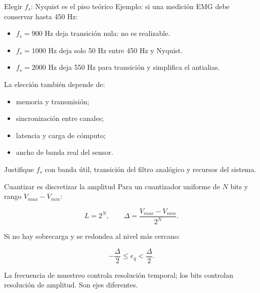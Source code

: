 \documentclass[
  ignorenonframetext,
  aspectratio=169,
  spanish,
  professionalfonts]{beamer}
\providecommand{\tightlist}{%
  \setlength{\itemsep}{0pt}\setlength{\parskip}{0pt}}
\begin{document}
\begin{frame}{Elegir \(f_s\): Nyquist es el piso teórico}
\protect{}\label{elegir-f_s-nyquist-es-el-piso-teuxf3rico}
Ejemplo: si una medición EMG debe conservar hasta 450 Hz:

\begin{itemize}
\tightlist
\item
  \(f_s=900\) Hz deja transición nula: no es realizable.
\item
  \(f_s=1000\) Hz deja solo 50 Hz entre 450 Hz y Nyquist.
\item
  \(f_s=2000\) Hz deja 550 Hz para transición y simplifica el antialias.
\end{itemize}

La elección también depende de:

\begin{itemize}
\tightlist
\item
  memoria y transmisión;
\item
  sincronización entre canales;
\item
  latencia y carga de cómputo;
\item
  ancho de banda real del sensor.
\end{itemize}

\begin{tcolorbox}[enhanced jigsaw, arc=.35mm, bottomrule=.15mm, bottomtitle=1mm, breakable, colback=white, colbacktitle=quarto-callout-note-color!10!white, colframe=quarto-callout-note-color-frame, coltitle=black, left=2mm, leftrule=.75mm, opacityback=0, opacitybacktitle=0.6, rightrule=.15mm, title={Criterio}, titlerule=0mm, toprule=.15mm, toptitle=1mm]

Justifique \(f_s\) con banda útil, transición del filtro analógico y
recursos del sistema.

\end{tcolorbox}
\end{frame}

\begin{frame}{Cuantizar es discretizar la amplitud}
\protect{}\label{cuantizar-es-discretizar-la-amplitud}
Para un cuantizador uniforme de \(N\) bits y rango \(V_{max}-V_{min}\):

\[
L=2^N,\qquad \Delta=\frac{V_{max}-V_{min}}{2^N}.
\]

Si no hay sobrecarga y se redondea al nivel más cercano:

\[
-\frac{\Delta}{2}\le e_q < \frac{\Delta}{2}.
\]

\begin{tcolorbox}[enhanced jigsaw, arc=.35mm, bottomrule=.15mm, bottomtitle=1mm, breakable, colback=white, colbacktitle=quarto-callout-important-color!10!white, colframe=quarto-callout-important-color-frame, coltitle=black, left=2mm, leftrule=.75mm, opacityback=0, opacitybacktitle=0.6, rightrule=.15mm, title={Distinción}, titlerule=0mm, toprule=.15mm, toptitle=1mm]

La frecuencia de muestreo controla resolución temporal; los bits
controlan resolución de amplitud. Son ejes diferentes.

\end{tcolorbox}
\end{frame}
\end{document}
